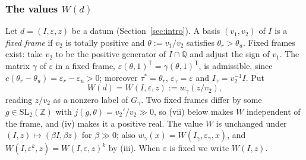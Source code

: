 \documentclass[11pt]{amsart}
\numberwithin{equation}{section}
\theoremstyle{plain}
\theoremstyle{definition}
\theoremstyle{remark}
\begin{document}
\subsubsection*{The values \(W(d)\)}
Let \(d=(I,\varepsilon,z)\) be a datum (Section~\ref{sec:intro}). A basis \((v_1,v_2)\) of \(I\) is a \emph{fixed frame} if \(v_2\) is totally positive and \(\theta:=v_1/v_2\) satisfies \(\theta_r>\theta_u\). Fixed frames exist: take \(v_2\) to be the positive generator of \(I\cap\mathbb Q\) and adjust the sign of \(v_1\). The matrix \(\gamma\) of \(\varepsilon\) in a fixed frame, \(\varepsilon(\theta,1)^{\mathsf T}=\gamma(\theta,1)^{\mathsf T}\), is admissible, since \(c(\theta_r-\theta_u)=\varepsilon_r-\varepsilon_u>0\); moreover \(\tau^*=\theta_r\), \(\varepsilon_\gamma=\varepsilon\) and \(I_\gamma=v_2^{-1}I\). Put
\[W(d)=W(I,\varepsilon,z):=w_\gamma(z/v_2),\]
reading \(z/v_2\) as a nonzero label of \(G_\gamma\). Two fixed frames differ by some \(g\in\mathrm{SL}_2(\mathbb Z)\) with \(j(g,\theta)=v_2'/v_2\gg0\), so (vii) below makes \(W\) independent of the frame, and (iv) makes it a positive real. The value \(W\) is unchanged under \((I,z)\mapsto(\beta I,\beta z)\) for \(\beta\gg0\); also \(w_\gamma(x)=W(I_\gamma,\varepsilon_\gamma,x)\), and \(W(I,\varepsilon^k,z)=W(I,\varepsilon,z)^k\) by (iii). When \(\varepsilon\) is fixed we write \(W(I,z)\).
\end{document}
